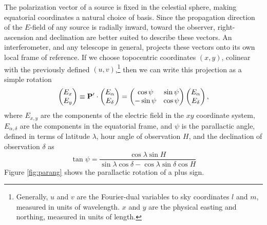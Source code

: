 The polarization vector of a source is fixed in the celestial sphere, making equatorial coordinates
a natural choice of basis. Since the propagation direction of the $E$-field of any source is
radially inward, toward the observer, right-ascension and declination are better suited to
describe these vectors. An interferometer, and any telescope in general, projects these vectors onto
its own local frame of reference. If we choose topocentric coordinates $(x,y)$, colinear with the
previously defined $(u,v)$,\footnote{Generally, $u$ and $v$ are the Fourier-dual variables to sky
coordinates $l$ and $m$, measured in units of wavelength. $x$ and $y$ are the physical easting and northing,
measured in units of length.} then we can write
this projection as a simple rotation
\begin{equation}
  \begin{pmatrix}E_x\\E_y\end{pmatrix}
  \equiv \mathbf{P}'\cdot\begin{pmatrix}E_\alpha\\E_\delta\end{pmatrix} =
  \begin{pmatrix}\cos\psi&\sin\psi\\-\sin\psi&\cos\psi\end{pmatrix}
  \begin{pmatrix}E_\alpha\\E_\delta\end{pmatrix},
\end{equation}
where $E_{x,y}$ are the components of the electric field in the $xy$ coordinate system,
$E_{\alpha,\delta}$ are the components in the equatorial frame, and
$\psi$ is the parallactic angle,
defined in terms of latitude $\lambda$, hour angle of observation $H$, and the
declination of observation $\delta$ as 
\begin{equation}
  \tan\psi = \frac{\cos\lambda\sin H}{\sin\lambda\cos\delta - \cos\lambda\sin\delta\cos H}
\end{equation}
Figure \ref{fig:parang} shows the parallactic rotation of a plus sign.


